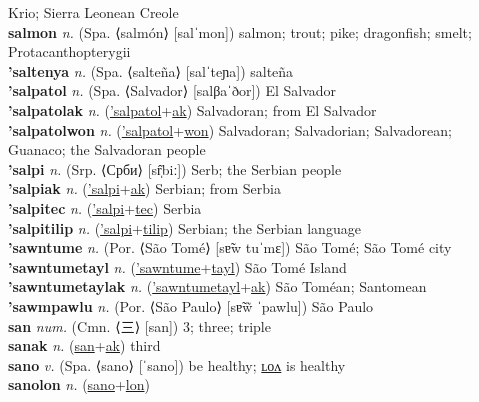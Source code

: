 Krio; Sierra Leonean Creole \label{'salontilip} \\
\textbf{salmon} \textit{n.} (Spa. ⟨salmón⟩ [salˈmon])
salmon; trout; pike; dragonfish; smelt; Protacanthopterygii \label{salmon} \\
\textbf{'saltenya} \textit{n.} (Spa. ⟨salteña⟩ [salˈteɲa])
salteña \label{'saltenya} \\
\textbf{'salpatol} \textit{n.} (Spa. ⟨Salvador⟩ [salβaˈðor])
El Salvador \label{'salpatol} \\
\textbf{'salpatolak} \textit{n.} (\hyperref['salpatol]{'salpatol}+\hyperref[ak]{ak})
Salvadoran; from El Salvador \label{'salpatolak} \\
\textbf{'salpatolwon} \textit{n.} (\hyperref['salpatol]{'salpatol}+\hyperref[won]{won})
Salvadoran; Salvadorian; Salvadorean; Guanaco; the Salvadoran people \label{'salpatolwon} \\
\textbf{'salpi} \textit{n.} (Srp. ⟨Срби⟩ [sr̩̂biː])
Serb; the Serbian people \label{'salpi} \\
\textbf{'salpiak} \textit{n.} (\hyperref['salpi]{'salpi}+\hyperref[ak]{ak})
Serbian; from Serbia \label{'salpiak} \\
\textbf{'salpitec} \textit{n.} (\hyperref['salpi]{'salpi}+\hyperref[tec]{tec})
Serbia \label{'salpitec} \\
\textbf{'salpitilip} \textit{n.} (\hyperref['salpi]{'salpi}+\hyperref[tilip]{tilip})
Serbian; the Serbian language \label{'salpitilip} \\
\textbf{'sawntume} \textit{n.} (Por. ⟨São Tomé⟩ [sɐ̃w tuˈmɛ])
São Tomé; São Tomé city \label{'sawntume} \\
\textbf{'sawntumetayl} \textit{n.} (\hyperref['sawntume]{'sawntume}+\hyperref[tayl]{tayl})
São Tomé Island \label{'sawntumetayl} \\
\textbf{'sawntumetaylak} \textit{n.} (\hyperref['sawntumetayl]{'sawntumetayl}+\hyperref[ak]{ak})
São Toméan; Santomean \label{'sawntumetaylak} \\
\textbf{'sawmpawlu} \textit{n.} (Por. ⟨São Paulo⟩ [sɐ̃w̃ ˈpawlu])
São Paulo \label{'sawmpawlu} \\
\textbf{san} \textit{num.} (Cmn. ⟨三⟩ [san])
3; three; triple \label{san} \\
\textbf{sanak} \textit{n.} (\hyperref[san]{san}+\hyperref[ak]{ak})
third \label{sanak} \\
\textbf{sano} \textit{v.} (Spa. ⟨sano⟩ [ˈsano])
be healthy; \hyperref[sanolon]{ʟᴏᴧ} is healthy \label{sano} \\
\textbf{sanolon} \textit{n.} (\hyperref[sano]{sano}+\hyperref[lon]{lon})
